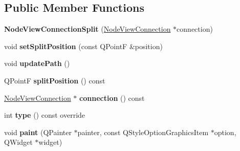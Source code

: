 \subsection*{Public Member Functions}
\begin{DoxyCompactItemize}
\item 
\mbox{\label{classrev_1_1_view_1_1_node_view_connection_split_ae437800fe2acdd850da451ae937a9649}} 
{\bfseries Node\+View\+Connection\+Split} (\mbox{\hyperlink{classrev_1_1_view_1_1_node_view_connection}{Node\+View\+Connection}} $\ast$connection)
\item 
\mbox{\label{classrev_1_1_view_1_1_node_view_connection_split_a2158a7b52280b8e6e20eb3c01d14b23f}} 
void {\bfseries set\+Split\+Position} (const Q\+PointF \&position)
\item 
\mbox{\label{classrev_1_1_view_1_1_node_view_connection_split_aa17dfebd2a0492058ac21b531f666063}} 
void {\bfseries update\+Path} ()
\item 
\mbox{\label{classrev_1_1_view_1_1_node_view_connection_split_a10d5f62707825f6d577591f3f0ec1cd4}} 
Q\+PointF {\bfseries split\+Position} () const
\item 
\mbox{\label{classrev_1_1_view_1_1_node_view_connection_split_abb2b98329878142939015e17cfb2a4a8}} 
\mbox{\hyperlink{classrev_1_1_view_1_1_node_view_connection}{Node\+View\+Connection}} $\ast$ {\bfseries connection} () const
\item 
\mbox{\label{classrev_1_1_view_1_1_node_view_connection_split_a134445580010a20e12c5d93c9a9ee37f}} 
int {\bfseries type} () const override
\item 
\mbox{\label{classrev_1_1_view_1_1_node_view_connection_split_a68cfbd5787ce9422bc40e6f9a3f597e9}} 
void {\bfseries paint} (Q\+Painter $\ast$painter, const Q\+Style\+Option\+Graphics\+Item $\ast$option, Q\+Widget $\ast$widget)
\end{DoxyCompactItemize}
